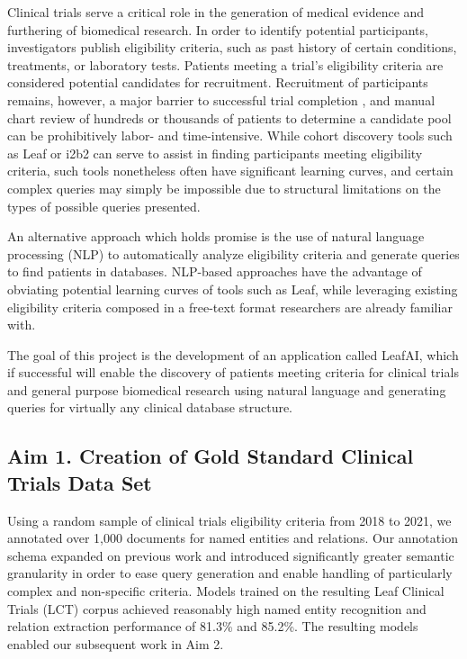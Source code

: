 \documentclass[../main.tex]{subfiles}
\begin{document}
\noindent Clinical trials serve a critical role in the generation of medical evidence and furthering of biomedical research. In order to identify potential participants, investigators publish eligibility criteria, such as past history of certain conditions, treatments, or laboratory tests. Patients meeting a trial's eligibility criteria are considered potential candidates for recruitment. Recruitment of participants remains, however, a major barrier to successful trial completion \cite{richesson2013electronic}, and manual chart review of hundreds or thousands of patients to determine a candidate pool can be prohibitively labor- and time-intensive. While cohort discovery tools such as Leaf \cite{dobbins2019leaf} or i2b2 \cite{murphy2010serving} can serve to assist in finding participants meeting eligibility criteria, such tools nonetheless often have significant learning curves, and certain complex queries may simply be impossible due to structural limitations on the types of possible queries presented.

An alternative approach which holds promise is the use of natural language processing (NLP) to automatically analyze eligibility criteria and generate queries to find patients in databases. NLP-based approaches have the advantage of obviating potential learning curves of tools such as Leaf, while leveraging existing eligibility criteria composed in a free-text format researchers are already familiar with.

The goal of this project is the development of an application called LeafAI, which if successful will enable the discovery of patients meeting criteria for clinical trials and general purpose biomedical research using natural language and generating queries for virtually any clinical database structure.

\subsection{Aim 1. Creation of Gold Standard Clinical Trials Data Set}
Using a random sample of clinical trials eligibility criteria from 2018 to 2021, we annotated over 1,000 documents for named entities and relations. Our annotation schema expanded on previous work \cite{kury2020chia, kang2017eliie} and introduced significantly greater semantic granularity in order to ease query generation and enable handling of particularly complex and non-specific criteria. Models trained on the resulting Leaf Clinical Trials (LCT) corpus achieved reasonably high named entity recognition and relation extraction performance of 81.3\% and 85.2\%. The resulting models enabled our subsequent work in Aim 2.
\end{document}
